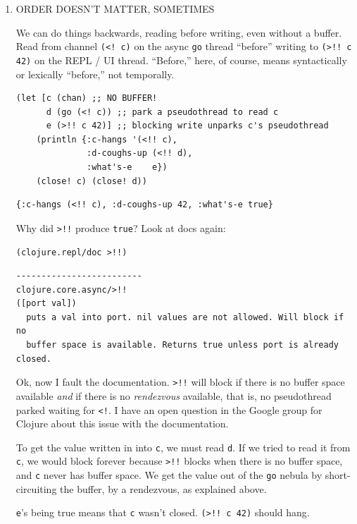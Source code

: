 \documentclass[10pt,oneside,x11names]{article}
\begin{document}
\begin{enumerate}
\item ORDER DOESN'T MATTER, SOMETIMES
\label{sec:org5e15d59}

We can do things backwards, reading before writing, even without a
buffer. Read from channel \texttt{(<! c)} on the async \texttt{go} thread ``before''
writing to \texttt{(>!! c 42)} on the REPL / UI thread. ``Before,'' here, of
course, means syntactically or lexically ``before,'' not temporally.

\begin{verbatim}
(let [c (chan) ;; NO BUFFER!
      d (go (<! c)) ;; park a pseudothread to read c
      e (>!! c 42)] ;; blocking write unparks c's pseudothread
    (println {:c-hangs '(<!! c),
              :d-coughs-up (<!! d),
              :what's-e    e})
    (close! c) (close! d))
\end{verbatim}

\begin{verbatim}
{:c-hangs (<!! c), :d-coughs-up 42, :what's-e true}
\end{verbatim}


Why did \texttt{>!!} produce \texttt{true}? Look at docs again:

\begin{verbatim}
(clojure.repl/doc >!!)
\end{verbatim}

\begin{verbatim}
-------------------------
clojure.core.async/>!!
([port val])
  puts a val into port. nil values are not allowed. Will block if no
  buffer space is available. Returns true unless port is already closed.
\end{verbatim}


Ok, now I fault the documentation. \texttt{>!!} will block if there is no
buffer space available \emph{and} if there is no \emph{rendezvous} available, that
is, no pseudothread parked waiting for \texttt{<!}. I have an open question in
the Google group for Clojure about this issue with the documentation.

To get the value written in into \texttt{c}, we must read \texttt{d}. If we tried to
read it from \texttt{c}, we would block forever because \texttt{>!!} blocks when there
is no buffer space, and \texttt{c} never has buffer space. We get the value out
of the \texttt{go} nebula by short-circuiting the buffer, by a rendezvous, as
explained above.

\texttt{e}'s being true means that \texttt{c} wasn't closed. \texttt{(>!! c 42)} should hang.


\end{enumerate}
\end{document}
